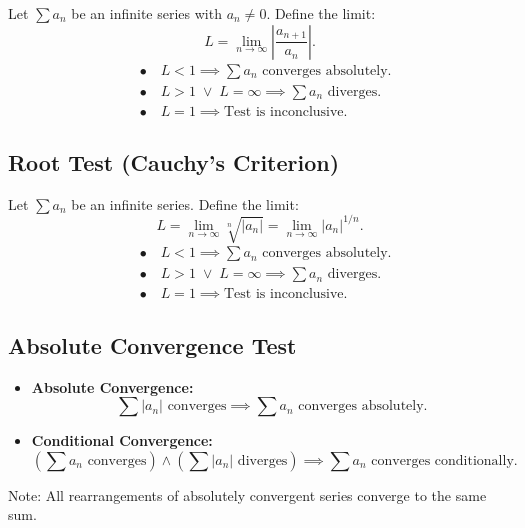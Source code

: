 \documentclass[a4paper,11pt]{article}
\theoremstyle{definition}
\theoremstyle{plain}
\theoremstyle{remark}
\begin{document}
\begin{tcolorbox}
    Let $\textstyle \sum a_n$ be an infinite series with $a_n \neq 0$. Define the limit:
    \[
    L = \lim_{n \to \infty} \left| \frac{a_{n+1}}{a_n} \right|.
    \]
    \[
    \begin{aligned}
        &\bullet \quad L < 1 \implies \sum a_n \text{ converges absolutely}. \\[8pt]  
        &\bullet \quad L > 1 \; \lor \; L = \infty \implies \sum a_n \text{ diverges}. \\[8pt]
        &\bullet \quad L = 1 \implies \text{Test is inconclusive}.
    \end{aligned}
    \]
\end{tcolorbox}




\subsection{Root Test (Cauchy's Criterion)}

\begin{tcolorbox}
    Let $\textstyle \sum a_n$ be an infinite series. Define the limit:
    \[
    L = \lim_{n \to \infty} \sqrt[n]{ \left| a_n \right| } = \lim_{n \to \infty} { \left| a_n \right| } ^ {1/n}.
    \]
    \[
    \begin{aligned}
        &\bullet \quad L < 1 \implies \sum a_n \text{ converges absolutely}. \\[8pt]  
        &\bullet \quad L > 1 \; \lor \; L = \infty \implies \sum a_n \text{ diverges}. \\[8pt]
        &\bullet \quad L = 1 \implies \text{Test is inconclusive}.
    \end{aligned}
    \]
\end{tcolorbox}




\subsection{Absolute Convergence Test}

\begin{tcolorbox}
    \begin{itemize}
        \item \textbf{Absolute Convergence:}
        \[
        \sum \left| a_n \right| \text{ converges} \implies \sum a_n \text{ converges absolutely}.
        \]
        \item \textbf{Conditional Convergence:}
        \[
        \left(\sum a_n \text{ converges} \right) \land \left(\sum \left| a_n \right| \text{ diverges} \right) \implies \sum a_n \text{ converges conditionally}.
        \]        
    \end{itemize}
    Note: All rearrangements of absolutely convergent series converge to the same sum.
\end{tcolorbox}
\end{document}

